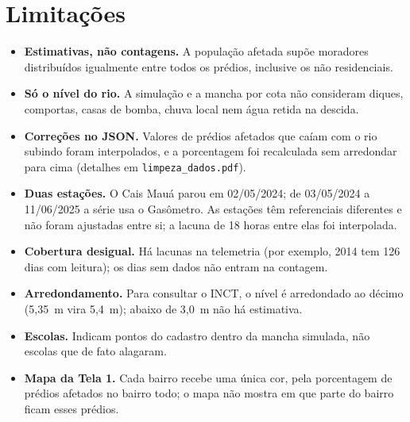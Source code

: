 \documentclass[11pt,a4paper]{article}
\begin{document}
\section{Limitações}
\begin{itemize}
  \item \textbf{Estimativas, não contagens.} A população afetada supõe moradores distribuídos igualmente entre todos os prédios, inclusive os não residenciais.
  \item \textbf{Só o nível do rio.} A simulação e a mancha por cota não consideram diques, comportas, casas de bomba, chuva local nem água retida na descida.
  \item \textbf{Correções no JSON.} Valores de prédios afetados que caíam com o rio subindo foram interpolados, e a porcentagem foi recalculada sem arredondar para cima (detalhes em \texttt{limpeza\_dados.pdf}).
  \item \textbf{Duas estações.} O Cais Mauá parou em 02/05/2024; de 03/05/2024 a 11/06/2025 a série usa o Gasômetro. As estações têm referenciais diferentes e não foram ajustadas entre si; a lacuna de 18 horas entre elas foi interpolada.
  \item \textbf{Cobertura desigual.} Há lacunas na telemetria (por exemplo, 2014 tem 126 dias com leitura); os dias sem dados não entram na contagem.
  \item \textbf{Arredondamento.} Para consultar o INCT, o nível é arredondado ao décimo (5,35~m vira 5,4~m); abaixo de 3,0~m não há estimativa.
  \item \textbf{Escolas.} Indicam pontos do cadastro dentro da mancha simulada, não escolas que de fato alagaram.
  \item \textbf{Mapa da Tela 1.} Cada bairro recebe uma única cor, pela porcentagem de prédios afetados no bairro todo; o mapa não mostra em que parte do bairro ficam esses prédios.
\end{itemize}
\end{document}
